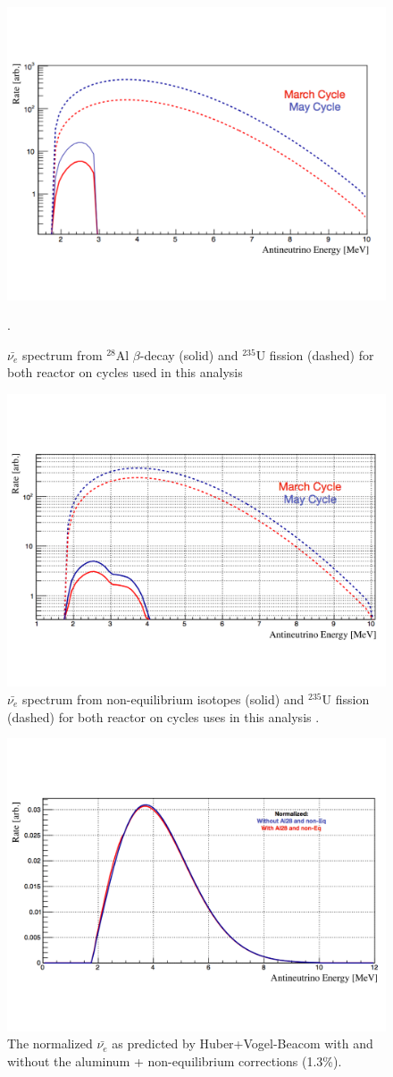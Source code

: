 \begin{figure}[H]
	\centering
	\includegraphics[width=0.6\linewidth]{tex/7-oscillation-images/AlContrib}
	\caption[]{$\bar{\nu_{e}}$ spectrum from $^{28}$Al $\beta$-decay (solid) and $^{235}$U fission (dashed) for both reactor on cycles used in this analysis \cite{PSurukuchi:2338}}.
	\label{fig:alcontrib}
\end{figure}

\begin{figure}[H]
	\centering
	\includegraphics[width=0.6\linewidth]{tex/7-oscillation-images/NonEqContrib}
	\caption[]{$\bar{\nu_{e}}$ spectrum from non-equilibrium isotopes (solid) and $^{235}$U fission (dashed) for both reactor on cycles uses in this analysis \cite{PSurukuchi:2346}.}
	\label{fig:noneqcontrib}
\end{figure}

\begin{figure}[H]
	\centering
	\includegraphics[width=0.7\linewidth]{tex/7-oscillation-images/SpectrumWithCorrections}
	\caption{The normalized $\bar{\nu_{e}}$ as predicted by Huber+Vogel-Beacom with and without the aluminum + non-equilibrium corrections (1.3\%).}
	\label{fig:spectrumwithcorrections}
\end{figure}


